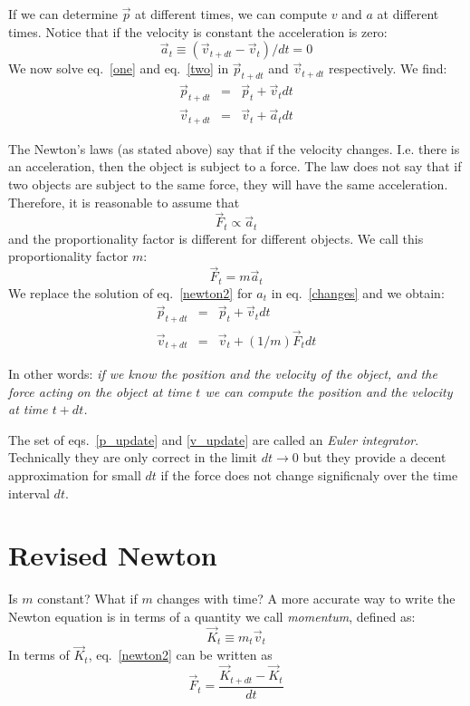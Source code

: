 \documentclass[12pt]{article}
\begin{document}
If we can determine $\vec p$ at different times, we can compute $v$ and $a$ at different times. Notice that if the velocity is constant the acceleration is zero:
\begin{equation}
\vec a_t \equiv (\vec v_{t+dt}-\vec v_t)/dt = 0
\end{equation}
We now solve eq.~\ref{one} and eq.~\ref{two} in $\vec p_{t+dt}$ and $\vec v_{t+dt}$ respectively. We find:
\begin{eqnarray}
\vec p_{t+dt} &=& \vec p_t + \vec v_t dt \\ 
\vec v_{t+dt} &=& \vec v_t + \vec a_t dt 
\label{changes}
\end{eqnarray}

The Newton's laws (as stated above) say that if the velocity changes. I.e. there is an acceleration, then the object is subject to a force. The law does not say that if two objects are subject to the same force, they will have the same acceleration. Therefore, it is reasonable to assume that
\begin{equation}
\vec F_t \propto \vec a_t
\end{equation}
and the proportionality factor is different for different objects. We call this proportionality factor $m$:
\begin{equation}
\vec F_t = m \vec a_t
\label{newton2}
\end{equation}
We replace the solution of eq.~\ref{newton2} for $a_t$ in eq.~\ref{changes} and we obtain:
\begin{eqnarray}
\vec p_{t+dt} &=& \vec p_t + \vec v_t dt \label{p_update} \\
\vec v_{t+dt} &=& \vec v_t + (1/m) \vec F_t dt \label{v_update}
\end{eqnarray}

In other words: {\it if we know the position and the velocity of the object, and the force acting on the object at time $t$ we can compute the position and the velocity at time $t+dt$.}

The set of eqs.~\ref{p_update} and \ref{v_update} are called an {\it Euler integrator}. Technically they are only correct in the limit $dt\rightarrow 0$ but they provide a decent approximation for small $dt$ if the force does not change significnaly over the time interval $dt$.

\section{Revised Newton}

Is $m$ constant? What if $m$ changes with time? A more accurate way to write the Newton equation is in terms of a quantity we call {\it momentum}, defined as:
\begin{equation}
\vec K_t \equiv m_t \vec v_t 
\end{equation}
In terms of $\vec K_t$, eq.~\ref{newton2} can be written as
\begin{equation}
\vec F_t = \frac{\vec K_{t+dt}-\vec K_t}{dt} 
\label{newton21}
\end{equation}
\end{document}
